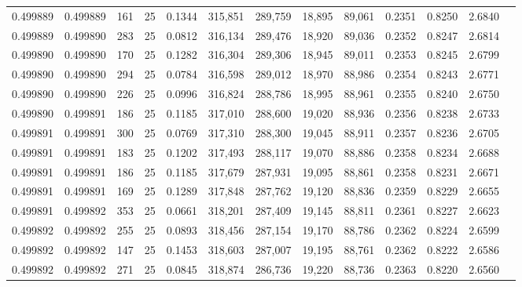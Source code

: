 \begin{tabular}{rrrrrrrrrrrrr}
0.499889 & 0.499889 &   161 &  25 &                                     0.1344 & 315,851 & 289,759 &  18,895 &  89,061 & 0.2351 & 0.8250 & 2.6840 \\
0.499889 & 0.499890 &   283 &  25 &                                     0.0812 & 316,134 & 289,476 &  18,920 &  89,036 & 0.2352 & 0.8247 & 2.6814 \\
0.499890 & 0.499890 &   170 &  25 &                                     0.1282 & 316,304 & 289,306 &  18,945 &  89,011 & 0.2353 & 0.8245 & 2.6799 \\
0.499890 & 0.499890 &   294 &  25 &                                     0.0784 & 316,598 & 289,012 &  18,970 &  88,986 & 0.2354 & 0.8243 & 2.6771 \\
0.499890 & 0.499890 &   226 &  25 &                                     0.0996 & 316,824 & 288,786 &  18,995 &  88,961 & 0.2355 & 0.8240 & 2.6750 \\
0.499890 & 0.499891 &   186 &  25 &                                     0.1185 & 317,010 & 288,600 &  19,020 &  88,936 & 0.2356 & 0.8238 & 2.6733 \\
0.499891 & 0.499891 &   300 &  25 &                                     0.0769 & 317,310 & 288,300 &  19,045 &  88,911 & 0.2357 & 0.8236 & 2.6705 \\
0.499891 & 0.499891 &   183 &  25 &                                     0.1202 & 317,493 & 288,117 &  19,070 &  88,886 & 0.2358 & 0.8234 & 2.6688 \\
0.499891 & 0.499891 &   186 &  25 &                                     0.1185 & 317,679 & 287,931 &  19,095 &  88,861 & 0.2358 & 0.8231 & 2.6671 \\
0.499891 & 0.499891 &   169 &  25 &                                     0.1289 & 317,848 & 287,762 &  19,120 &  88,836 & 0.2359 & 0.8229 & 2.6655 \\
0.499891 & 0.499892 &   353 &  25 &                                     0.0661 & 318,201 & 287,409 &  19,145 &  88,811 & 0.2361 & 0.8227 & 2.6623 \\
0.499892 & 0.499892 &   255 &  25 &                                     0.0893 & 318,456 & 287,154 &  19,170 &  88,786 & 0.2362 & 0.8224 & 2.6599 \\
0.499892 & 0.499892 &   147 &  25 &                                     0.1453 & 318,603 & 287,007 &  19,195 &  88,761 & 0.2362 & 0.8222 & 2.6586 \\
0.499892 & 0.499892 &   271 &  25 &                                     0.0845 & 318,874 & 286,736 &  19,220 &  88,736 & 0.2363 & 0.8220 & 2.6560 \\

\end{tabular}
